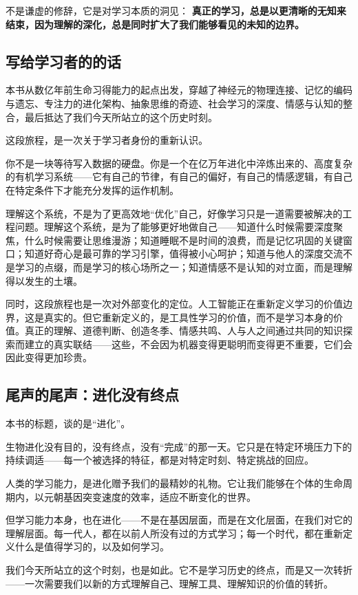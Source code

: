 \documentclass[11pt]{article}
\begin{document}
不是谦虚的修辞，它是对学习本质的洞见： \textbf{真正的学习，总是以更清晰的无知来结束，因为理解的深化，总是同时扩大了我们能够看见的未知的边界。}
\subsection{写给学习者的的话}
\label{sec:org3b7dfe6}

本书从数亿年前生命习得能力的起点出发，穿越了神经元的物理连接、记忆的编码与遗忘、专注力的进化架构、抽象思维的奇迹、社会学习的深度、情感与认知的整合，最后抵达了我们今天所站立的这个历史时刻。

这段旅程，是一次关于学习者身份的重新认识。

你不是一块等待写入数据的硬盘。你是一个在亿万年进化中淬炼出来的、高度复杂的有机学习系统——它有自己的节律，有自己的偏好，有自己的情感逻辑，有自己在特定条件下才能充分发挥的运作机制。

理解这个系统，不是为了更高效地“优化”自己，好像学习只是一道需要被解决的工程问题。理解这个系统，是为了能够更好地做自己——知道什么时候需要深度聚焦，什么时候需要让思维漫游；知道睡眠不是时间的浪费，而是记忆巩固的关键窗口；知道好奇心是最可靠的学习引擎，值得被小心呵护；知道与他人的深度交流不是学习的点缀，而是学习的核心场所之一；知道情感不是认知的对立面，而是理解得以发生的土壤。

同时，这段旅程也是一次对外部变化的定位。人工智能正在重新定义学习的价值边界，这是真实的。但它重新定义的，是工具性学习的价值，而不是学习本身的价值。真正的理解、道德判断、创造冬季、情感共鸣、人与人之间通过共同的知识探索而建立的真实联结——这些，不会因为机器变得更聪明而变得更不重要，它们会因此变得更加珍贵。
\subsection{尾声的尾声：进化没有终点}
\label{sec:orgba95aa3}

本书的标题，谈的是“进化”。

生物进化没有目的，没有终点，没有“完成”的那一天。它只是在特定环境压力下的持续调适——每一个被选择的特征，都是对特定时刻、特定挑战的回应。

人类的学习能力，是进化赠予我们的最精妙的礼物。它让我们能够在个体的生命周期内，以元朝基因突变速度的效率，适应不断变化的世界。

但学习能力本身，也在进化——不是在基因层面，而是在文化层面，在我们对它的理解层面。每一代人，都在以前人所没有过的方式学习；每一个时代，都在重新定义什么是值得学习的，以及如何学习。

我们今天所站立的这个时刻，也是如此。它不是学习历史的终点，而是又一次转折——一次需要我们以新的方式理解自己、理解工具、理解知识的价值的转折。
\end{document}
